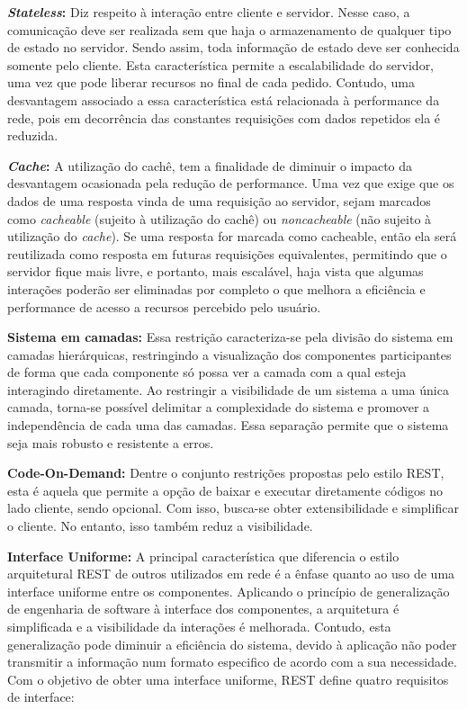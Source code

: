 \textbf{\emph{Stateless}:} Diz respeito à interação entre cliente e servidor. Nesse caso, a  comunicação deve ser realizada sem que haja o armazenamento de qualquer tipo de estado no servidor. Sendo assim,  toda informação de estado deve ser conhecida somente pelo cliente.  Esta característica permite a escalabilidade do servidor, uma vez que pode liberar recursos no final de cada pedido.
Contudo, uma desvantagem associado a essa característica  está relacionada à performance da rede, pois em decorrência das constantes requisições com dados repetidos  ela é reduzida.

\textbf{\emph{Cache}:} A utilização do cachê, tem  a finalidade de diminuir o impacto da desvantagem ocasionada pela redução de performance. Uma vez que exige que os dados de uma resposta vinda de uma requisição ao servidor, sejam marcados como \emph{cacheable} (sujeito à utilização do cachê) ou \emph{noncacheable} (não sujeito à utilização do \emph{cache}). Se uma resposta for marcada como cacheable, então ela será reutilizada como resposta em futuras requisições equivalentes, permitindo que o servidor fique mais livre, e portanto, mais escalável, haja vista que algumas interações poderão ser eliminadas por completo o que melhora a eficiência e  performance  de acesso a recursos percebido pelo usuário.

\textbf{Sistema em camadas:} Essa restrição caracteriza-se pela divisão do sistema em camadas hierárquicas, restringindo a visualização dos componentes participantes de forma que cada componente só possa ver a camada com a qual esteja interagindo diretamente. Ao restringir a visibilidade de um sistema a uma única camada, torna-se possível delimitar a complexidade do sistema e promover a independência de cada uma das camadas.  Essa separação permite que  o sistema seja mais robusto e resistente a erros.

\textbf{Code-On-Demand:} Dentre o conjunto restrições propostas pelo estilo REST, esta é aquela que permite a opção de baixar e executar diretamente códigos no  lado cliente, sendo opcional. Com isso, busca-se  obter extensibilidade e simplificar  o cliente. No entanto, isso também reduz a visibilidade.

\textbf{Interface Uniforme:} A principal característica que diferencia o estilo arquitetural REST de outros utilizados em rede é a ênfase  quanto ao uso de uma interface uniforme entre os componentes. Aplicando o princípio de generalização de engenharia de software à interface dos componentes, a arquitetura é simplificada e a visibilidade da interações é melhorada. Contudo, esta generalização pode diminuir a eficiência do sistema, devido à aplicação não poder transmitir a informação num formato especifico de acordo com a sua  necessidade.  Com o objetivo de obter uma interface uniforme, REST define quatro requisitos de interface:

